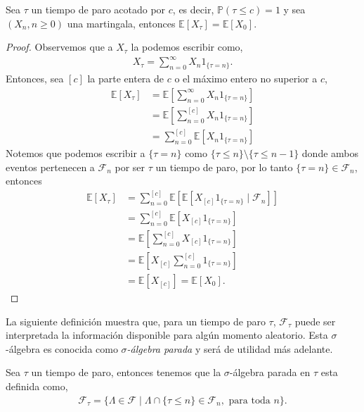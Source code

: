 \begin{proposition} 
\label{espconst}
	Sea $\tau$ un tiempo de paro acotado por $c$, es decir, $\mathbb{P}(\tau \leq c) = 1$ y sea $(X_n, n \geq 0)$ una martingala, entonces  $\mathbb{E}[X_{\tau}] = \mathbb{E}[X_0]$.
\end{proposition}
\begin{proof}
	Observemos que a $X_{\tau}$ la podemos escribir como,
	\begin{align*}
		X_{\tau} = \sum_{n=0}^{\infty} X_n1_{ \{\tau = n\} }.
	\end{align*}
	Entonces, sea $[c]$ la parte entera de $c$ o el máximo entero no superior a $c$,
	\begin{align*}
		\mathbb{E}[X_{\tau}] & = \mathbb{E}\left[\sum_{n=0}^{\infty} X_n 1_{ \{\tau = n\} } \right] \\
		& = \mathbb{E}\left[\sum_{n=0}^{[c]} X_n  1_{ \{\tau = n\} }\right] \\
		& = \sum_{n=0}^{[c]} \mathbb{E}[X_n 1_{ \{\tau = n\} }]
	\end{align*}
	Notemos que podemos escribir a $\{ \tau = n\}$ como $\{ \tau \leq n\} \setminus \{ \tau \leq n-1\}$ donde ambos eventos pertenecen a $\mathcal{F}_n$ por ser $\tau$ un tiempo de paro, por lo tanto $\{ \tau = n\} \in \mathcal{F}_n$, entonces
	\begin{align*}
		 \mathbb{E}[X_{\tau}] & = \sum_{n=0}^{[c]} \mathbb{E}[\mathbb{E}[X_{[c]} 1_{ \{\tau = n\} } \mid \mathcal{F}_n]] \\
		 & = \sum_{n=0}^{[c]} \mathbb{E}[X_{[c]}  1_{ \{\tau = n\} }] \\
		 & = \mathbb{E}\left[\sum_{n=0}^{[c]} X_{[c]} 1_{ \{\tau = n\} }\right] \\
		 & = \mathbb{E}\left[X_{[c]}  \sum_{n=0}^{[c]} 1_{ \{\tau = n\} }\right] \\
		 & = \mathbb{E}[X_{[c]}] = \mathbb{E}[X_0].
	\end{align*}
\end{proof}

La siguiente definición muestra que, para un tiempo de paro $\tau$, $\mathcal{F}_{\tau}$ puede ser interpretada la información disponible para algún momento aleatorio. Esta $\sigma$-álgebra es conocida como \emph{$\sigma$-álgebra parada} y será de utilidad más adelante.

\begin{definition}  \label{algebraaleatoria}
	Sea $\tau$ un tiempo de paro, entonces tenemos que la $\sigma$-álgebra parada en $\tau$ esta definida como,
	\begin{align*}
	\mathcal{F}_{\tau} = \{ \Lambda \in \mathcal{F} \mid \Lambda \cap \{ \tau \leq n \} \in \mathcal{F}_n, \text{ para toda } n \}.
	\end{align*}
\end{definition}


